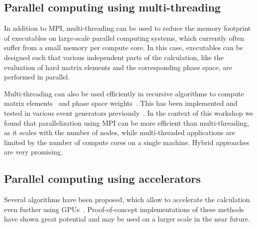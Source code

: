\subsection{Parallel computing using multi-threading}
In addition to MPI, multi-threading can be used to reduce the memory
footprint of executables on large-scale parallel computing systems, which
currently often suffer from a small memory per compute core. In this
case, executables can be designed such that various independent parts
of the calculation, like the evaluation of hard matrix elements and
the corresponding phase space, are performed in parallel.

Multi-threading can also be used efficiently in recursive algorithms
to compute matrix elements~\cite{Berends:1987me} and phase space 
weights~\cite{Byckling:1969sx}. This has been implemented and tested
in various event generators previously~\cite{Gleisberg:2008fv,Giele:2010ks}.  
In the context of this workshop we found that parallelization using MPI 
can be more efficient than multi-threading, as it scales with the number 
of nodes, while multi-threaded applications are limited by the number of 
compute cores on a single machine.  Hybrid approaches are very promising.

\subsection{Parallel computing using accelerators}
Several algorithms have been proposed, which allow to accelerate the
calculation even further using
GPUs~\cite{Hagiwara:2009aq,Giele:2010ks,Hagiwara:2013oka}.
Proof-of-concept implementations of these methods have shown great
potential and may be used on a larger scale in the near future.


